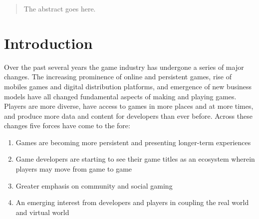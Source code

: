 \documentclass[conference]{IEEEtran}
\begin{document}
\begin{abstract}
The abstract goes here.
\end{abstract}





%
\IEEEpeerreviewmaketitle




\section{Introduction}
Over the past several years the game industry has undergone a series of major changes. The increasing prominence of online and persistent games, rise of mobiles games and digital distribution platforms, and emergence of new business models have all changed fundamental aspects of making and playing games. Players are more diverse, have access to games in more places and at more times, and produce more data and content for developers than ever before. Across these changes five forces have come to the fore:
\begin{enumerate}
\item Games are becoming more persistent and presenting longer-term experiences %
\item Game developers are starting to see their game titles as an ecosystem wherein players may move from game to game %
\item Greater emphasis on community and social gaming %
\item An emerging interest from developers and players in coupling the real world and virtual world %
\end{enumerate}
\end{document}
